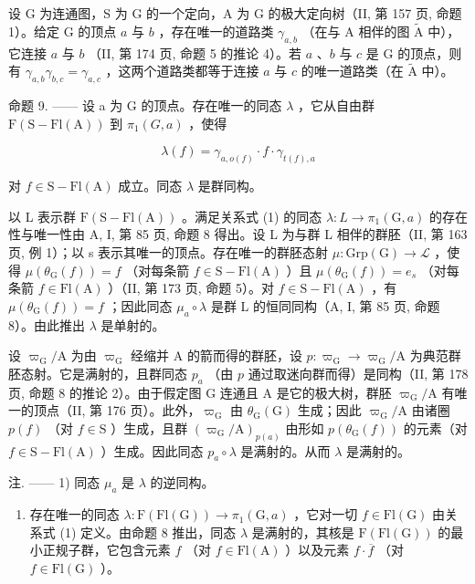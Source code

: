 设 G 为连通图，S 为 G 的一个定向，A 为 G 的极大定向树（II, 第 157 页, 命题 1）。给定 G 的顶点 \(a\) 与 \(b\) ，存在唯一的道路类 \(\gamma_{a,b}\) （在与 A 相伴的图 \(\widetilde{\mathrm{A}}\) 中），它连接 \(a\) 与 \(b\) （II, 第 174 页, 命题 5 的推论 4）。若 \(a\) 、\(b\) 与 \(c\) 是 G 的顶点，则有 \(\gamma_{a,b}\gamma_{b,c} = \gamma_{a,c}\) ，这两个道路类都等于连接 \(a\) 与 \(c\) 的唯一道路类（在 \(\widetilde{\mathrm{A}}\) 中）。

命题 9. —— 设 a 为 G 的顶点。存在唯一的同态 \(\lambda\) ，它从自由群 \(\mathrm{F}(\mathrm{S}-\mathrm{Fl}(\mathrm{A}))\) 到 \(\pi_1(G, a)\) ，使得

\[
\lambda (f) = \gamma_ {a, o (f)} \cdot f \cdot \gamma_ {t (f), a}\tag{1}
\]

对 \(f \in \mathrm{S} - \mathrm{Fl}(\mathrm{A})\) 成立。同态 \(\lambda\) 是群同构。

以 L 表示群 \(\mathrm{F}(\mathrm{S}-\mathrm{Fl}(\mathrm{A}))\) 。满足关系式 (1) 的同态 \(\lambda\colon L\to\pi_{1}(\mathrm{G},a)\) 的存在性与唯一性由 A, I, 第 85 页, 命题 8 得出。设 L 为与群 L 相伴的群胚（II, 第 163 页, 例 1）；以 s 表示其唯一的顶点。存在唯一的群胚态射 \(\mu\colon\mathrm{Grp}(\mathrm{G})\to\mathcal{L}\) ，使得 \(\mu(\theta_{\mathrm{G}}(f))=f\) （对每条箭 \(f\in\mathrm{S}-\mathrm{Fl}(\mathrm{A})\) ）且 \(\mu(\theta_{\mathrm{G}}(f))=e_{s}\) （对每条箭 \(f\in\mathrm{Fl}(\mathrm{A})\) ）（II, 第 173 页, 命题 5）。对 \(f\in\mathrm{S}-\mathrm{Fl}(\mathrm{A})\) ，有 \(\mu(\theta_{\mathrm{G}}(f))=f\) ；因此同态 \(\mu_{a}\circ\lambda\) 是群 L 的恒同同构（A, I, 第 85 页, 命题 8）。由此推出 \(\lambda\) 是单射的。

设 \(\varpi_{\mathrm{G}} / \mathrm{A}\) 为由 \(\varpi_{\mathrm{G}}\) 经缩并 A 的箭而得的群胚，设 \(p\colon \varpi_{\mathrm{G}}\to \varpi_{\mathrm{G}} / \mathrm{A}\) 为典范群胚态射。它是满射的，且群同态 \(p_a\) （由 \(p\) 通过取迷向群而得）是同构（II, 第 178 页, 命题 8 的推论 2）。由于假定图 G 连通且 A 是它的极大树，群胚 \(\varpi_{\mathrm{G}} / \mathrm{A}\) 有唯一的顶点（II, 第 176 页）。此外，\(\varpi_{\mathrm{G}}\) 由 \(\theta_{\mathrm{G}}(\mathrm{G})\) 生成；因此 \(\varpi_{\mathrm{G}} / \mathrm{A}\) 由诸圈 \(p(f)\) （对 \(f\in \mathrm{S}\) ）生成，且群 \((\varpi_{\mathrm{G}} / \mathrm{A})_{p(a)}\) 由形如 \(p(\theta_{\mathrm{G}}(f))\) 的元素（对 \(f\in \mathrm{S} - \mathrm{Fl}(\mathrm{A})\) ）生成。因此同态 \(p_a\circ \lambda\) 是满射的。从而 \(\lambda\) 是满射的。

注. —— 1) 同态 \(\mu_{a}\) 是 \(\lambda\) 的逆同构。

\begin{enumerate}
\def\labelenumi{\arabic{enumi})}
\setcounter{enumi}{1}
\tightlist
\item
  存在唯一的同态 \(\lambda\colon\mathrm{F}(\mathrm{Fl}(\mathrm{G}))\to\pi_{1}(\mathrm{G},a)\) ，它对一切 \(f\in\mathrm{Fl}(\mathrm{G})\) 由关系式 (1) 定义。由命题 8 推出，同态 \(\lambda\) 是满射的，其核是 \(\mathrm{F}(\mathrm{Fl}(\mathrm{G}))\) 的最小正规子群，它包含元素 \(f\) （对 \(f\in\mathrm{Fl}(\mathrm{A})\) ）以及元素 \(f\cdot\overline{f}\) （对 \(f\in\mathrm{Fl}(\mathrm{G})\) ）。
\end{enumerate}

